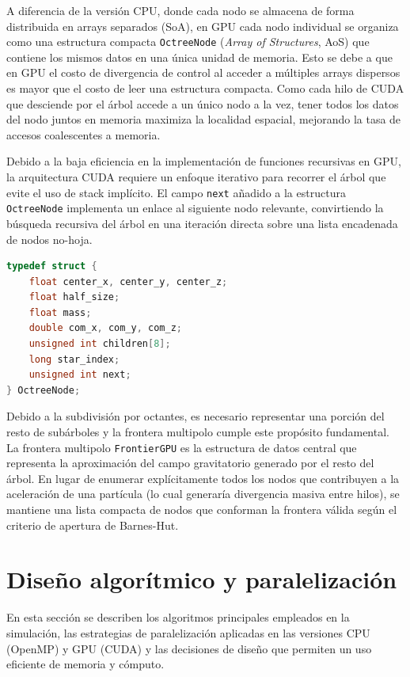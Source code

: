 A diferencia de la versión CPU, donde cada nodo se almacena de forma distribuida en arrays separados (SoA), en GPU cada nodo individual se organiza como una estructura compacta \texttt{OctreeNode} (\textit{Array of Structures}, AoS) que contiene los mismos datos en una única unidad de memoria.
Esto se debe a que en GPU el costo de divergencia de control al acceder a múltiples arrays dispersos es mayor que el costo de leer una estructura compacta.
Como cada hilo de CUDA que desciende por el árbol accede a un único nodo a la vez, tener todos los datos del nodo juntos en memoria maximiza la localidad espacial, mejorando la tasa de accesos coalescentes a memoria.

Debido a la baja eficiencia en la implementación de funciones recursivas en GPU, la arquitectura CUDA requiere un enfoque iterativo para recorrer el árbol que evite el uso de stack implícito.
El campo \texttt{next} añadido a la estructura \texttt{OctreeNode} implementa un enlace al siguiente nodo relevante, convirtiendo la búsqueda recursiva del árbol en una iteración directa sobre una lista encadenada de nodos no-hoja.
\begin{lstlisting}[language=C,caption=Estructura OctreeNode,label={lst:lstlisting4}]
typedef struct {
    float center_x, center_y, center_z;
    float half_size;
    float mass;
    double com_x, com_y, com_z;
    unsigned int children[8];
    long star_index;
    unsigned int next;
} OctreeNode;
\end{lstlisting}

Debido a la subdivisión por octantes, es necesario representar una porción del resto de subárboles y la frontera multipolo cumple este propósito fundamental.
La frontera multipolo \texttt{FrontierGPU} es la estructura de datos central que representa la aproximación del campo gravitatorio generado por el resto del árbol.
En lugar de enumerar explícitamente todos los nodos que contribuyen a la aceleración de una partícula (lo cual generaría divergencia masiva entre hilos), se mantiene una lista compacta de nodos que conforman la frontera válida según el criterio de apertura de Barnes-Hut.

\section{Diseño algorítmico y paralelización}\label{sec:diseno-algoritmico-y-paralelizacion}

En esta sección se describen los algoritmos principales empleados en la simulación, las estrategias de paralelización aplicadas en las versiones CPU (OpenMP) y GPU (CUDA) y las decisiones de diseño que permiten un uso eficiente de memoria y cómputo.

